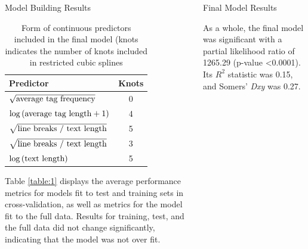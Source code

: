 \documentclass[final]{beamer}
\newlength{\onecolwid}
\newlength{\twocolwid}
\begin{document}
\begin{frame}[t]
\begin{columns}[t]
\begin{column}{\twocolwid}
\begin{columns}[t,totalwidth=\twocolwid]
\begin{column}{\onecolwid}
\begin{block}{Model Building Results}
\renewcommand{\arraystretch}{1.2} %
\begin{table}[!htbp]
\vspace{2ex}
\begin{tabular}{| l | c |}
    \hline
    \textbf{Predictor} & \textbf{Knots} \\
    \hline
    $\sqrt{\textnormal{average tag frequency}}$ & 0 \\
    $\log\left({\textnormal{average tag length} + 1}\right)$ & 4 \\
    $\sqrt{\textnormal{line breaks / text length}}$ & 5 \\
    $\sqrt{\textnormal{line breaks / text length}}$ & 3 \\
    $\log\left({\textnormal{text length}}\right)$ & 5 \\
    \hline
\end{tabular}
\caption{Form of continuous predictors included in the final model (knots indicates the number of knots included in restricted cubic splines}
\label{table:continuous}
\end{table}

Table \ref{table:1} displays the average performance metrics for models fit to test and training sets in cross-validation, as well as metrics for the model fit to the full data. Results for training, test, and the full data did not change significantly, indicating that the model was not over fit. 

\end{block}



\end{column} %

\begin{column}{\onecolwid}\vspace{-.6in} %


\begin{block}{Final Model Results}

As a whole, the final model was significant with a partial likelihood ratio of 1265.29 (p-value \textless0.0001). Its $R^2$ statistic was 0.15, and Somers' \textit{Dxy} was 0.27. 


\end{block}
\end{column}
\end{columns}
\end{column}
\end{columns}
\end{frame}
\end{document}
